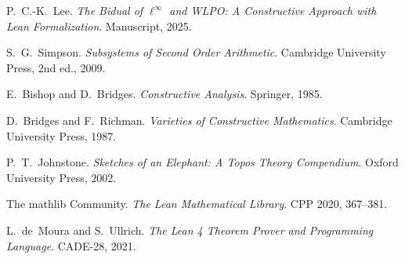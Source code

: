 \documentclass[11pt]{article}
\begin{document}
\begin{thebibliography}{10}

P.~C.-K.~Lee.
\emph{The Bidual of $\ell^\infty$ and WLPO: A Constructive Approach with Lean Formalization}.
Manuscript, 2025.

S.~G.~Simpson.
\emph{Subsystems of Second Order Arithmetic}.
Cambridge University Press, 2nd ed., 2009.

E.~Bishop and D.~Bridges.
\emph{Constructive Analysis}.
Springer, 1985.

D.~Bridges and F.~Richman.
\emph{Varieties of Constructive Mathematics}.
Cambridge University Press, 1987.

P.~T.~Johnstone.
\emph{Sketches of an Elephant: A Topos Theory Compendium}.
Oxford University Press, 2002.

The mathlib Community.
\emph{The Lean Mathematical Library}.
CPP 2020, 367--381.

L.~de~Moura and S.~Ullrich.
\emph{The Lean 4 Theorem Prover and Programming Language}.
CADE-28, 2021.

\end{thebibliography}
\end{document}
